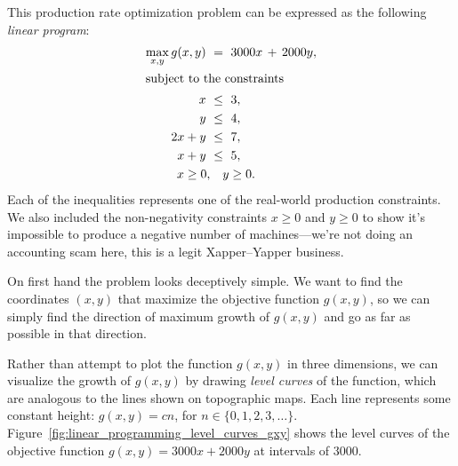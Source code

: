 \documentclass[11pt,oneside]{article}
\begin{document}
	This production rate optimization problem can be expressed as the following \emph{linear program}:
	\begin{align*}
		\max_{x,y} 	g(x,y) \ &=\  3000x  \, + \,  2000y, \\  %
	\intertext{subject to the constraints}
				x 		\ &\leq \		3,	\\
					y	\ &\leq \	 	4,	\\
				2x	+ y	\ &\leq \	 	7,	\\
				x 	+ y	\ &\leq \	 	5,	\\
				x \geq 0, 	& \quad  	y \geq 0.
	\end{align*}
	Each of the inequalities represents one of the real-world production constraints.
	We also included the non-negativity constraints $x \geq 0$ and $y \geq 0$ to show
	it's impossible to produce a negative number of machines---we're not doing an accounting scam here,
	this is a legit Xapper--Yapper business.
	
	
	On first hand the problem looks deceptively simple.
	We want to find the coordinates $(x,y)$ that maximize the objective function $g(x,y)$,
	so we can simply find the direction of maximum growth of $g(x,y)$ and go as far as 
	possible in that direction.
	
	Rather than attempt to plot the function $g(x,y)$ in three dimensions,
	we can visualize the growth of $g(x,y)$ by drawing \emph{level curves} of the function,
	which are analogous to the lines shown on topographic maps.
	Each line represents some constant height: $g(x,y)=cn$, for $n \in \{0,1,2,3, \ldots \}$.
	Figure~\ref{fig:linear_programming_level_curves_gxy} shows the level curves
	of the objective function $g(x,y)=3000x +  2000y$ at intervals of $3000$.
				
\end{document}
